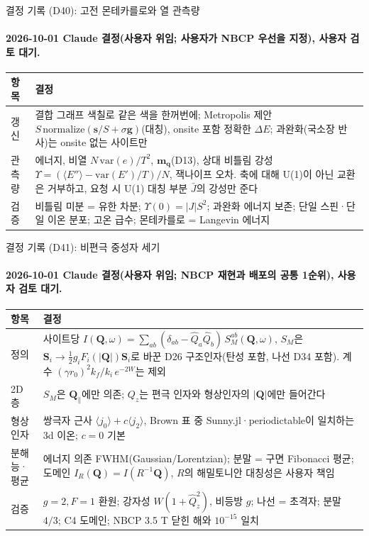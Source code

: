 \begin{frame}[label=decisions-d40-monte-carlo]{결정 기록 (D40): 고전 몬테카를로와 열 관측량}
  \framesubtitle{2026-10-01 Claude 결정(사용자 위임; 사용자가 NBCP 우선을 지정), 사용자 검토 대기.}
  \small\renewcommand{\arraystretch}{1.12}
  \begin{tabularx}{\textwidth}{@{}P{3.0cm}Y@{}}
    \toprule
    항목 & 결정 \\
    \midrule
    갱신 & 결합 그래프 색칠로 같은 색을 한꺼번에; Metropolis 제안 $S\,\mathrm{normalize}(\mathbf s/S+\sigma\mathbf g)$(대칭), onsite 포함 정확한 $\Delta E$; 과완화(국소장 반사)는 onsite 없는 사이트만 \\
    관측량 & 에너지, 비열 $N\,\mathrm{var}(e)/T^2$, $\mathbf m_{\mathbf q}$(D13), 상대 비틀림 강성 $\Upsilon=(\langle E''\rangle-\mathrm{var}(E')/T)/N$, 잭나이프 오차. 축에 대해 U(1)이 아닌 교환은 거부하고, 요청 시 U(1) 대칭 부분 $\bar J$의 강성만 준다 \\
    검증 & 비틀림 미분 = 유한 차분; $\Upsilon(0)=|J|S^2$; 과완화 에너지 보존; 단일 스핀·단일 이온 분포; 고온 급수; 몬테카를로 = Langevin 에너지 \\
    \bottomrule
  \end{tabularx}
\end{frame}

\begin{frame}[label=decisions-d41-neutron]{결정 기록 (D41): 비편극 중성자 세기}
  \framesubtitle{2026-10-01 Claude 결정(사용자 위임; NBCP 재현과 배포의 공통 1순위), 사용자 검토 대기.}
  \small\renewcommand{\arraystretch}{1.12}
  \begin{tabularx}{\textwidth}{@{}P{3.0cm}Y@{}}
    \toprule
    항목 & 결정 \\
    \midrule
    정의 & 사이트당 $I(\mathbf Q,\omega)=\sum_{ab}(\delta_{ab}-\hat Q_a\hat Q_b)\,S_M^{ab}(\mathbf Q,\omega)$, $S_M$은 $\mathbf S_i\to\tfrac12 g_i F_i(|\mathbf Q|)\mathbf S_i$로 바꾼 D26 구조인자(탄성 포함, 나선 D34 포함). 계수 $(\gamma r_0)^2 k_f/k_i\,e^{-2W}$는 제외 \\
    2D 층 & $S_M$은 $\mathbf Q_\parallel$에만 의존; $Q_z$는 편극 인자와 형상인자의 $|\mathbf Q|$에만 들어간다 \\
    형상인자 & 쌍극자 근사 $\langle j_0\rangle+c\langle j_2\rangle$, Brown 표 중 Sunny.jl·periodictable이 일치하는 3d 이온; $c=0$ 기본 \\
    분해능·평균 & 에너지 의존 FWHM(Gaussian/Lorentzian); 분말 = 구면 Fibonacci 평균; 도메인 $I_R(\mathbf Q)=I(R^{-1}\mathbf Q)$, $R$의 해밀토니안 대칭성은 사용자 책임 \\
    검증 & $g=2,F=1$ 환원; 강자성 $W(1+\hat Q_z^2)$, 비등방 $g$; 나선 = 초격자; 분말 $4/3$; C4 도메인; NBCP 3.5 T 닫힌 해와 $10^{-15}$ 일치 \\
    \bottomrule
  \end{tabularx}
\end{frame}

